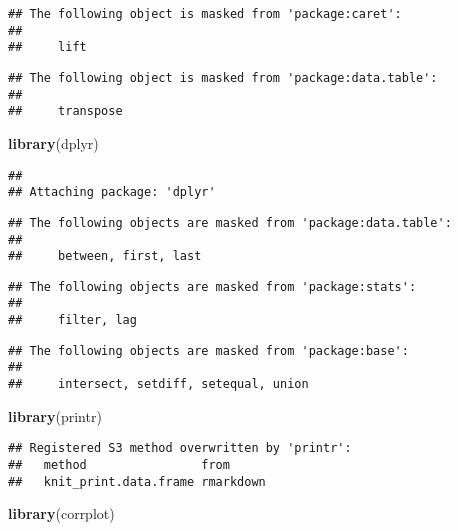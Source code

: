 \documentclass[
]{article}
\newenvironment{Shaded}{\begin{snugshade}}{\end{snugshade}}
\newcommand{\FunctionTok}[1]{\textcolor[rgb]{0.13,0.29,0.53}{\textbf{#1}}}
\newcommand{\NormalTok}[1]{#1}
\begin{document}
\begin{verbatim}
## The following object is masked from 'package:caret':
## 
##     lift
\end{verbatim}

\begin{verbatim}
## The following object is masked from 'package:data.table':
## 
##     transpose
\end{verbatim}

\begin{Shaded}
\begin{Highlighting}[]
\FunctionTok{library}\NormalTok{(dplyr)}
\end{Highlighting}
\end{Shaded}

\begin{verbatim}
## 
## Attaching package: 'dplyr'
\end{verbatim}

\begin{verbatim}
## The following objects are masked from 'package:data.table':
## 
##     between, first, last
\end{verbatim}

\begin{verbatim}
## The following objects are masked from 'package:stats':
## 
##     filter, lag
\end{verbatim}

\begin{verbatim}
## The following objects are masked from 'package:base':
## 
##     intersect, setdiff, setequal, union
\end{verbatim}

\begin{Shaded}
\begin{Highlighting}[]
\FunctionTok{library}\NormalTok{(printr)}
\end{Highlighting}
\end{Shaded}

\begin{verbatim}
## Registered S3 method overwritten by 'printr':
##   method                from     
##   knit_print.data.frame rmarkdown
\end{verbatim}

\begin{Shaded}
\begin{Highlighting}[]
\FunctionTok{library}\NormalTok{(corrplot)}
\end{Highlighting}
\end{Shaded}
\end{document}
